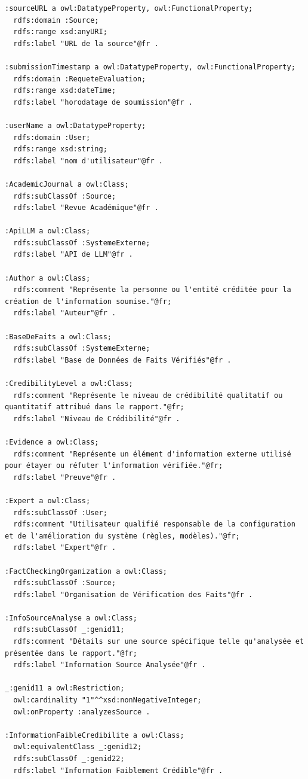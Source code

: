 \documentclass[9pt,twocolumn,french]{article}
\begin{document}
\begin{lstlisting}[language=Turtle,basicstyle=\ttfamily\tiny,frame=single]
:sourceURL a owl:DatatypeProperty, owl:FunctionalProperty;
  rdfs:domain :Source;
  rdfs:range xsd:anyURI;
  rdfs:label "URL de la source"@fr .

:submissionTimestamp a owl:DatatypeProperty, owl:FunctionalProperty;
  rdfs:domain :RequeteEvaluation;
  rdfs:range xsd:dateTime;
  rdfs:label "horodatage de soumission"@fr .

:userName a owl:DatatypeProperty;
  rdfs:domain :User;
  rdfs:range xsd:string;
  rdfs:label "nom d'utilisateur"@fr .

:AcademicJournal a owl:Class;
  rdfs:subClassOf :Source;
  rdfs:label "Revue Académique"@fr .

:ApiLLM a owl:Class;
  rdfs:subClassOf :SystemeExterne;
  rdfs:label "API de LLM"@fr .

:Author a owl:Class;
  rdfs:comment "Représente la personne ou l'entité créditée pour la création de l'information soumise."@fr;
  rdfs:label "Auteur"@fr .

:BaseDeFaits a owl:Class;
  rdfs:subClassOf :SystemeExterne;
  rdfs:label "Base de Données de Faits Vérifiés"@fr .

:CredibilityLevel a owl:Class;
  rdfs:comment "Représente le niveau de crédibilité qualitatif ou quantitatif attribué dans le rapport."@fr;
  rdfs:label "Niveau de Crédibilité"@fr .

:Evidence a owl:Class;
  rdfs:comment "Représente un élément d'information externe utilisé pour étayer ou réfuter l'information vérifiée."@fr;
  rdfs:label "Preuve"@fr .

:Expert a owl:Class;
  rdfs:subClassOf :User;
  rdfs:comment "Utilisateur qualifié responsable de la configuration et de l'amélioration du système (règles, modèles)."@fr;
  rdfs:label "Expert"@fr .

:FactCheckingOrganization a owl:Class;
  rdfs:subClassOf :Source;
  rdfs:label "Organisation de Vérification des Faits"@fr .

:InfoSourceAnalyse a owl:Class;
  rdfs:subClassOf _:genid11;
  rdfs:comment "Détails sur une source spécifique telle qu'analysée et présentée dans le rapport."@fr;
  rdfs:label "Information Source Analysée"@fr .

_:genid11 a owl:Restriction;
  owl:cardinality "1"^^xsd:nonNegativeInteger;
  owl:onProperty :analyzesSource .

:InformationFaibleCredibilite a owl:Class;
  owl:equivalentClass _:genid12;
  rdfs:subClassOf _:genid22;
  rdfs:label "Information Faiblement Crédible"@fr .


\end{lstlisting}
\end{document}
